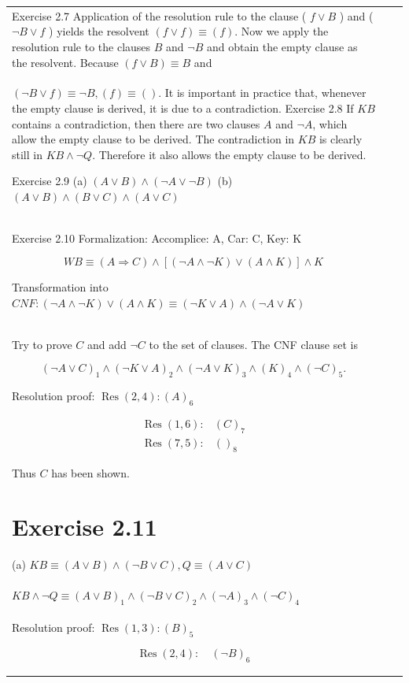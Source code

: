 \documentclass[10pt]{book}
\begin{document}
\begin{center}
\begin{tabular}{|l|l|l|}
Exercise 2.7 Application of the resolution rule to the clause ( $f \vee B$ ) and ( $\neg B \vee f$ ) yields the resolvent $(f \vee f) \equiv(f)$. Now we apply the resolution rule to the clauses $B$ and $\neg B$ and obtain the empty clause as the resolvent. Because $(f \vee B) \equiv B$ and\\
$(\neg B \vee f) \equiv \neg B,(f) \equiv()$. It is important in practice that, whenever the empty clause is derived, it is due to a contradiction.
Exercise 2.8 If $K B$ contains a contradiction, then there are two clauses $A$ and $\neg A$, which allow the empty clause to be derived. The contradiction in $K B$ is clearly still in $K B \wedge \neg Q$. Therefore it also allows the empty clause to be derived.

Exercise 2.9 (a) $(A \vee B) \wedge(\neg A \vee \neg B)$ (b) $(A \vee B) \wedge(B \vee C) \wedge(A \vee C)$\\
Exercise 2.10 Formalization: Accomplice: A, Car: C, Key: K

$$
W B \equiv(A \Rightarrow C) \wedge[(\neg A \wedge \neg K) \vee(A \wedge K)] \wedge K
$$

Transformation into $C N F:(\neg A \wedge \neg K) \vee(A \wedge K) \equiv(\neg K \vee A) \wedge(\neg A \vee K)$\\
Try to prove $C$ and add $\neg C$ to the set of clauses. The CNF clause set is

$$
(\neg A \vee C)_{1} \wedge(\neg K \vee A)_{2} \wedge(\neg A \vee K)_{3} \wedge(K)_{4} \wedge(\neg C)_{5} .
$$

Resolution proof: $\operatorname{Res}(2,4):(A)_{6}$

$$
\begin{array}{ll}
\operatorname{Res}(1,6): & (C)_{7} \\
\operatorname{Res}(7,5): & ()_{8}
\end{array}
$$

Thus $C$ has been shown.

\section{Exercise 2.11}
(a) $K B \equiv(A \vee B) \wedge(\neg B \vee C), Q \equiv(A \vee C)$\\
$K B \wedge \neg Q \equiv(A \vee B)_{1} \wedge(\neg B \vee C)_{2} \wedge(\neg A)_{3} \wedge(\neg C)_{4}$\\
Resolution proof: $\operatorname{Res}(1,3):(B)_{5}$

$$
\operatorname{Res}(2,4): \quad(\neg B)_{6}
$$


\end{tabular}
\end{center}
\end{document}
